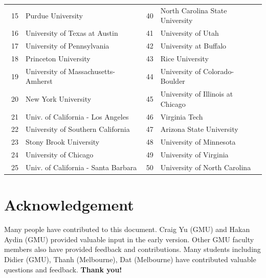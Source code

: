 \documentclass[11pt]{article}
\newcommand{\red}[1]{{\color{red}{#1}}}
\begin{document}
\begin{table}
\begin{tabular}{rl|rl}
    15 &   Purdue University  &40& North Carolina State University\\\  
    16 & University of Texas at Austin   &41 & University of Utah \\
    17 & University of Pennsylvania\red{$^*$} &42 & University at Buffalo\red{$^*$}\\
    18 & Princeton University  & 43& Rice University\\
    19 & University of Massachusetts-Amherst\red{$^*$} & 44&  University of Colorado-Boulder \\
    20 &  New York University  &45& University of Illinois at Chicago  \\
    21 & Univ. of California - Los Angeles &46& Virginia Tech\red{$^*$}  \\
    22 & University of Southern California &47&  Arizona State University\red{$^*$} \\
    23 & Stony Brook University\red{$^*$} &48&University of Minnesota \\
    24 & University of Chicago &49& University of Virginia \\
    25 & Univ. of California - Santa Barbara &50& University of North Carolina\red{$^*$} \\
    \bottomrule
    \end{tabular}
\end{table}

\section{Acknowledgement}

Many people have contributed to this document.
Craig Yu (GMU) and Hakan Aydin (GMU) provided valuable input in the early version. Other GMU faculty members also have provided feedback and contributions.  Many students including Didier (GMU), Thanh (Melbourne), Dat (Melbourne) have contributed valuable questions and feedback. 
\textbf{Thank you!}





\newpage
\end{document}
